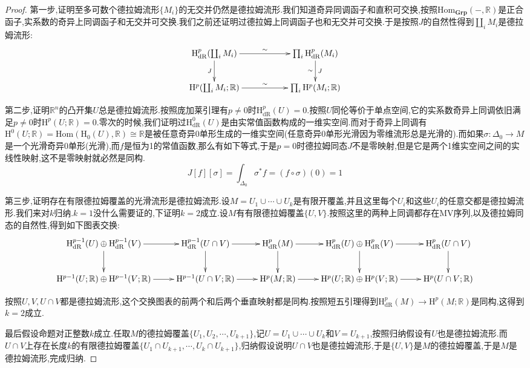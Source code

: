 \begin{enumerate}
\begin{proof}
    	第一步,证明至多可数个德拉姆流形$\{M_i\}$的无交并仍然是德拉姆流形.我们知道奇异同调函子和直积可交换,按照$\mathrm{Hom}_{\textbf{Grp}}(-,\mathbb{R})$是正合函子,实系数的奇异上同调函子和无交并可交换.我们之前还证明过德拉姆上同调函子也和无交并可交换.于是按照$J$的自然性得到$\coprod_iM_i$是德拉姆流形:
    	$$\xymatrix{\mathrm{H}^p_{\mathrm{dR}}(\coprod_iM_i)\ar[rr]^{\sim}\ar[d]_J&&\prod_i\mathrm{H}^p_{\mathrm{dR}}(M_i)\ar[d]^J_{\sim}\\\mathrm{H}^p(\coprod_iM_i;\mathbb{R})\ar[rr]^{\sim}&&\prod_i\mathrm{H}^p(M_i;\mathbb{R})}$$
    	
    	第二步,证明$\mathbb{R}^n$的凸开集$U$总是德拉姆流形.按照庞加莱引理有$p\not=0$时$\mathrm{H}^p_{\mathrm{dR}}(U)=0$.按照$U$同伦等价于单点空间,它的实系数奇异上同调依旧满足$p\not=0$时$\mathrm{H}^p(U;\mathbb{R})=0$.零次的时候,我们证明过$\mathrm{H}^0_{\mathrm{dR}}(U)$是由实常值函数构成的一维实空间.而对于奇异上同调有$\mathrm{H}^0(U;\mathbb{R})=\mathrm{Hom}(\mathrm{H}_0(U),\mathbb{R})\cong\mathbb{R}$是被任意奇异0单形生成的一维实空间(任意奇异0单形光滑因为零维流形总是光滑的).而如果$\sigma:\Delta_0\to M$是一个光滑奇异0单形(光滑),而$f$是恒为1的常值函数,那么有如下等式,于是$p=0$时德拉姆同态$J$不是零映射,但是它是两个1维实空间之间的实线性映射,这不是零映射就必然是同构.
    	$$J[f][\sigma]=\int_{\Delta_0}\sigma^*f=(f\circ\sigma)(0)=1$$
    	
    	第三步,证明存在有限德拉姆覆盖的光滑流形是德拉姆流形.设$M=U_1\cup\cdots\cup U_k$是有限开覆盖,并且这里每个$U_i$和这些$U_i$的任意交都是德拉姆流形.我们来对$k$归纳.$k=1$没什么需要证的,下证明$k=2$成立.设$M$有有限德拉姆覆盖$\{U,V\}$.按照这里的两种上同调都存在MV序列,以及德拉姆同态的自然性,得到如下图表交换:
    	$$\xymatrix{\mathrm{H}^{p-1}_{\mathrm{dR}}(U)\oplus\mathrm{H}^{p-1}_{\mathrm{dR}}(V)\ar[r]\ar[d]&\mathrm{H}^{p-1}_{\mathrm{dR}}(U\cap V)\ar[r]\ar[d]&\mathrm{H}^p_{\mathrm{dR}}(M)\ar[r]\ar[d]&\mathrm{H}^p_{\mathrm{dR}}(U)\oplus\mathrm{H}^p_{\mathrm{dR}}(V)\ar[r]\ar[d]&\mathrm{H}^p_{\mathrm{dR}}(U\cap V)\ar[d]\\\mathrm{H}^{p-1}(U;\mathbb{R})\oplus\mathrm{H}^{p-1}(V;\mathbb{R})\ar[r]&\mathrm{H}^{p-1}(U\cap V;\mathbb{R})\ar[r]&\mathrm{H}^p(M;\mathbb{R})\ar[r]&\mathrm{H}^p(U;\mathbb{R})\oplus\mathrm{H}^p(V;\mathbb{R})\ar[r]&\mathrm{H}^p(U\cap V;\mathbb{R})}$$
    	
    	按照$U,V,U\cap V$都是德拉姆流形,这个交换图表的前两个和后两个垂直映射都是同构.按照短五引理得到$\mathrm{H}^p_{\mathrm{dR}}(M)\to\mathrm{H}^p(M;\mathbb{R})$是同构,这得到$k=2$成立.
    	
    	最后假设命题对正整数$k$成立.任取$M$的德拉姆覆盖$\{U_1,U_2,\cdots,U_{k+1}\}$,记$U=U_1\cup\cdots\cup U_k$和$V=U_{k+1}$,按照归纳假设有$U$也是德拉姆流形.而$U\cap V$上存在长度$k$的有限德拉姆覆盖$\{U_1\cap U_{k+1},\cdots,U_k\cap U_{k+1}\}$,归纳假设说明$U\cap V$也是德拉姆流形,于是$\{U,V\}$是$M$的德拉姆覆盖,于是$M$是德拉姆流形,完成归纳.
    	

\end{proof}
\end{enumerate}
